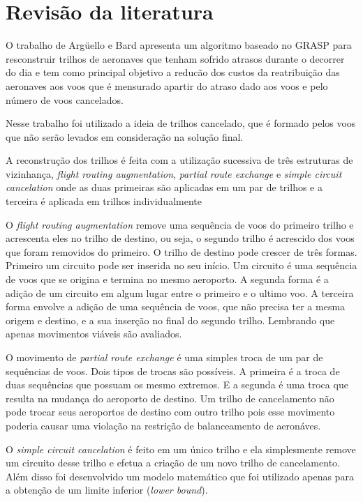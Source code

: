 \chapter{Revisão da literatura}
  
	
O trabalho de Argüello e Bard \cite{arguelo1997}  apresenta um
algoritmo baseado no GRASP para resconstruir trilhos de aeronaves que tenham
sofrido atrasos durante o decorrer do dia e tem como principal objetivo a
reducão dos custos da reatribuição das aeronaves aos voos que é mensurado
apartir do atraso dado aos voos e pelo número de voos cancelados. 

Nesse trabalho foi utilizado a ideia de trilhos cancelado, que é formado
pelos voos que não serão levados em consideração na solução final. 
		
A reconstrução dos trilhos é feita com a utilização sucessiva de três
estruturas de vizinhança, \textit{flight routing augmentation}, \textit{partial route exchange} e
\textit{simple circuit cancelation} onde as duas primeiras são aplicadas em um
par de trilhos e a terceira é aplicada em trilhos individualmente

O \textit{flight routing augmentation} remove uma sequência de voos do
primeiro trilho e acrescenta eles no trilho de destino, ou seja, o segundo
trilho é acrescido dos voos que foram removidos do primeiro. O trilho de
destino pode crescer de três formas. Primeiro um circuito pode ser inserida
no seu início. Um circuito é uma sequência de voos que se origina e termina no
mesmo aeroporto. A segunda forma é a adição de um circuito em algum lugar
entre o primeiro e o ultimo voo. A terceira forma envolve a adição de uma
sequência de voos, que não precisa ter a mesma origem e destino, e a sua
inserção no final do segundo trilho. Lembrando que apenas movimentos viáveis
são avaliados. 
		
O movimento de \textit{partial route exchange} é uma simples
troca de um par de sequências de voos. Dois tipos de trocas são possíveis. A
primeira é a troca de duas sequências que possuam os mesmo extremos. E a
segunda é uma troca que resulta na mudança do aeroporto de destino. Um trilho
de cancelamento não pode trocar seus aeroportos de destino com outro trilho
pois esse movimento poderia causar uma violação na restrição de balanceamento
de aeronáves.
		
O \textit{simple circuit cancelation} é feito em um único trilho e ela
simplesmente remove um circuito desse trilho e efetua a criação de um novo
trilho de cancelamento. Além disso foi desenvolvido um modelo matemático que
foi utilizado apenas para a obtenção de um limite inferior (\textit{lower
bound}).
		
